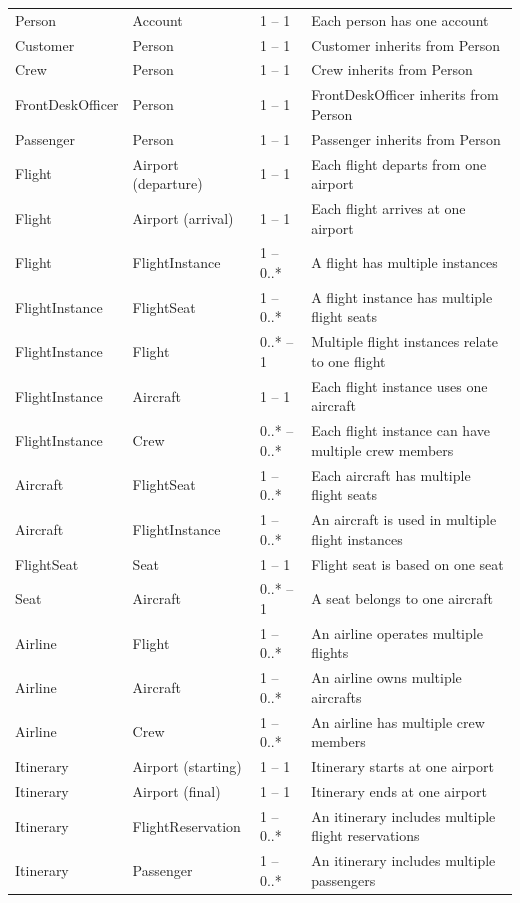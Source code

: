\begin{longtable}{|p{3cm}|p{3cm}|p{3cm}|p{5cm}|}
Person & Account & 1 – 1 & Each person has one account \\
Customer & Person & 1 – 1 & Customer inherits from Person \\
Crew & Person & 1 – 1 & Crew inherits from Person \\
FrontDeskOfficer & Person & 1 – 1 & FrontDeskOfficer inherits from Person \\
Passenger & Person & 1 – 1 & Passenger inherits from Person \\
Flight & Airport (departure) & 1 – 1 & Each flight departs from one airport \\
Flight & Airport (arrival) & 1 – 1 & Each flight arrives at one airport \\
Flight & FlightInstance & 1 – 0..* & A flight has multiple instances \\
FlightInstance & FlightSeat & 1 – 0..* & A flight instance has multiple flight seats \\
FlightInstance & Flight & 0..* – 1 & Multiple flight instances relate to one flight \\
FlightInstance & Aircraft & 1 – 1 & Each flight instance uses one aircraft \\
FlightInstance & Crew & 0..* – 0..* & Each flight instance can have multiple crew members \\
Aircraft & FlightSeat & 1 – 0..* & Each aircraft has multiple flight seats \\
Aircraft & FlightInstance & 1 – 0..* & An aircraft is used in multiple flight instances \\
FlightSeat & Seat & 1 – 1 & Flight seat is based on one seat \\
Seat & Aircraft & 0..* – 1 & A seat belongs to one aircraft \\
Airline & Flight & 1 – 0..* & An airline operates multiple flights \\
Airline & Aircraft & 1 – 0..* & An airline owns multiple aircrafts \\
Airline & Crew & 1 – 0..* & An airline has multiple crew members \\
Itinerary & Airport (starting) & 1 – 1 & Itinerary starts at one airport \\
Itinerary & Airport (final) & 1 – 1 & Itinerary ends at one airport \\
Itinerary & FlightReservation & 1 – 0..* & An itinerary includes multiple flight reservations \\
Itinerary & Passenger & 1 – 0..* & An itinerary includes multiple passengers \\

\end{longtable}
